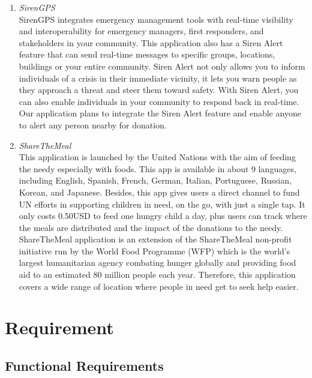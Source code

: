 \documentclass[conference]{IEEEtran}
\begin{document}
\begin{enumerate}
\item \textit{SirenGPS} \\
SirenGPS integrates emergency management tools with real-time visibility and interoperability for emergency managers, first responders, and stakeholders in your community. This application also has a Siren Alert feature that can send real-time messages to specific groups, locations, buildings or your entire community. Siren Alert not only allows you to inform individuals of a crisis in their immediate vicinity, it lets you warn people as they approach a threat and steer them toward safety. With Siren Alert, you can also enable individuals in your community to respond back in real-time. Our application plans to integrate the Siren Alert feature and enable anyone to alert any person nearby for donation. \\
\item \textit{ShareTheMeal}\\
This application is launched by the United Nations with the aim of feeding the needy especially with foods. This app is available in about 9 languages, including English, Spanish, French, German, Italian, Portuguese, Russian, Korean, and Japanese. Besides, this app gives users a direct channel to fund UN efforts in supporting children in need, on the go, with just a single tap. It only costs 0.50USD to feed one hungry child a day, plus users can track where the meals are distributed and the impact of the donations to the needy. ShareTheMeal application is an extension of the ShareTheMeal non-profit initiative run by the World Food Programme (WFP) which is the world’s largest humanitarian agency combating hunger globally and providing food aid to an estimated 80 million people each year. Therefore, this application covers a wide range of location where people in need get to seek help easier.\\
\end{enumerate}


\section{Requirement}

\subsection{Functional Requirements}
\end{document}
